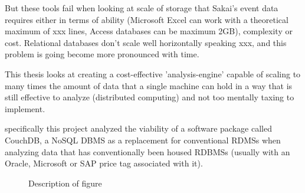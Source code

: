 \documentclass[parskip=full]{scrartcl}
\begin{document}
But these tools fail when looking at scale of storage that Sakai's event data requires either in terms of ability (Microsoft Excel can work with a theoretical maximum of xxx lines, Access databases can be maximum 2GB), complexity or cost. Relational databases don't scale well horizontally speaking xxx, and this problem is going become more pronounced with time.

This thesis looks at creating a cost-effective 'analysis-engine' capable of scaling to many times the amount of data that a single machine can hold in a way that is still effective to analyze (distributed computing) and not too mentally taxing to implement.

specifically this project analyzed the viability of a software package called CouchDB, a NoSQL DBMS as a replacement for conventional RDMSs when analyzing data that has conventionally been housed RDBMSs (usually with an Oracle, Microsoft or SAP price tag associated with it).




\begin{figure}[h]
    \centering
    
    \caption{Description of figure}
\end{figure}



\newpage


\end{document}
